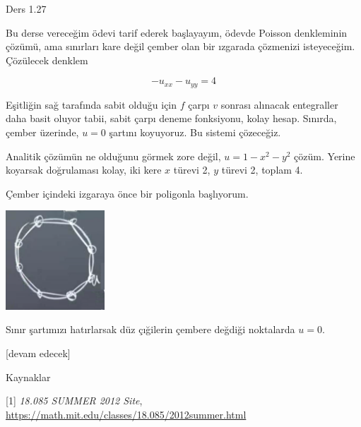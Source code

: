 \documentclass[12pt,fleqn]{article}\usepackage{../../common}
\begin{document}
Ders 1.27

Bu derse vereceğim ödevi tarif ederek başlayayım, ödevde Poisson denkleminin
çözümü, ama sınırları kare değil çember olan bir ızgarada çözmenizi
isteyeceğim. Çözülecek denklem

$$
-u_{xx} - u_{yy} = 4
$$

Eşitliğin sağ tarafında sabit olduğu için $f$ çarpı $v$ sonrası alınacak
entegraller daha basit oluyor tabii, sabit çarpı deneme fonksiyonu, kolay hesap.
Sınırda, çember üzerinde, $u = 0$ şartını koyuyoruz. Bu sistemi çözeceğiz.

Analitik çözümün ne olduğunu görmek zore değil, $u = 1 - x^2 - y^2$ çözüm.
Yerine koyarsak doğrulaması kolay, iki kere $x$ türevi 2, $y$ türevi 2, toplam
4.

Çember içindeki izgaraya önce bir poligonla başlıyorum.

\includegraphics[width=10em]{compscieng_1_27_01.png}

Sınır şartımızı hatırlarsak düz çığilerin çembere değdiği noktalarda $u = 0$.









[devam edecek]

Kaynaklar

[1] {\em 18.085 SUMMER 2012 Site},
    \url{https://math.mit.edu/classes/18.085/2012summer.html}
\end{document}
